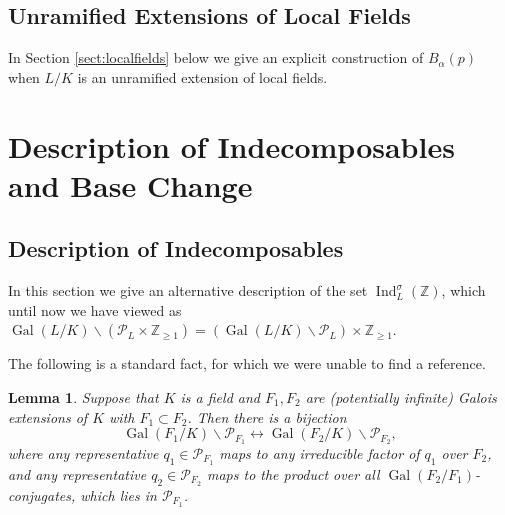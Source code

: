 \documentclass[10pt, reqno, hidelinks]{amsart}
\DeclareMathOperator{\Gal}{Gal}
\DeclareMathOperator{\Ind}{Ind}
\newcommand{\bZ}{{\mathbb Z}}
\newcommand{\sP}{{\mathcal P}}
\numberwithin{thm}{subsection}
\newtheorem{lemma}[thm]{Lemma}
\theoremstyle{definition}
\begin{document}
\subsection{Unramified Extensions of Local Fields}

In Section \ref{sect:localfields} below we give an explicit construction of $B_{\alpha}(p)$ when $L / K$ is an unramified extension of local fields.

\section{Description of Indecomposables and Base Change}\label{sect:basechange}

\subsection{Description of Indecomposables}\label{sect:altdescofirred}

In this section we give an alternative description of the set $\Ind_L^{\sigma}(\bZ)$, which until now we have viewed as $\Gal(L/K) \backslash (\sP_L \times \bZ_{\geq 1}) = (\Gal(L/K) \backslash \sP_L) \times \bZ_{\geq 1}$.

The following is a standard fact, for which we were unable to find a reference.

\begin{lemma}
	Suppose that $K$ is a field and $F_1, F_2$ are (potentially infinite) Galois extensions of $K$ with $F_1 \subset F_2$. Then there is a bijection
	\[
	\Gal(F_1/K) \backslash \sP_{F_1} \leftrightarrow \Gal(F_2/K) \backslash \sP_{F_2},
	\]
	where any representative $q_1 \in \sP_{F_1}$ maps to any irreducible factor of $q_1$ over $F_2$, and any representative $q_2 \in \sP_{F_2}$ maps to the product over all $\Gal(F_2 / F_1)$-conjugates, which lies in $\sP_{F_1}$.
\end{lemma}
\end{document}
